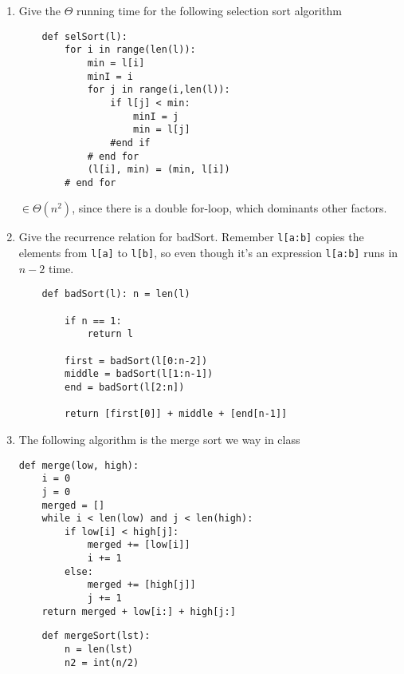 \documentclass[basic, header]{nosvagor-notes}
\begin{document}
\begin{enumerate}[itemsep=4em]
  \newpage %

  \item

    Give the $\Theta$ running time for the following selection sort algorithm
    \begin{verbatim}
    def selSort(l):
        for i in range(len(l)):
            min = l[i]
            minI = i
            for j in range(i,len(l)):
                if l[j] < min:
                    minI = j
                    min = l[j]
                #end if
            # end for
            (l[i], min) = (min, l[i])
        # end for
    \end{verbatim}

    \(\in \Theta(n^2)\), since there is a double for-loop, which dominants other factors.

  \item Give the recurrence relation for badSort. Remember \texttt{l[a:b]}
    copies the elements from \texttt{l[a]} to \texttt{l[b]}, so even though
    it's an expression \texttt{l[a:b]} runs in $n-2$ time.

    \begin{verbatim}
    def badSort(l): n = len(l)

        if n == 1:
            return l

        first = badSort(l[0:n-2])
        middle = badSort(l[1:n-1])
        end = badSort(l[2:n])

        return [first[0]] + middle + [end[n-1]]
    \end{verbatim}

  \newpage %

  \item The following algorithm is the merge sort we way in class

    \begin{multicols}{2}
      \begin{verbatim}
def merge(low, high):
    i = 0
    j = 0
    merged = []
    while i < len(low) and j < len(high):
        if low[i] < high[j]:
            merged += [low[i]]
            i += 1
        else:
            merged += [high[j]]
            j += 1
    return merged + low[i:] + high[j:]
      \end{verbatim}
      \vspace{5em}
      \begin{verbatim}
    def mergeSort(lst):
        n = len(lst)
        n2 = int(n/2)


\end{verbatim}
\end{multicols}
\end{enumerate}
\end{document}
